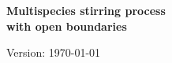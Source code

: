 \documentclass[10pt]{article}
\numberwithin{equation}{section}
\numberwithin{equation}{subsection}
\begin{document}
 
 
\begingroup
\begin{center}
 \begingroup\LARGE
\bf Multispecies stirring process \\
 with open boundaries
\par\endgroup
 \vspace{3.5em}
 \begingroup\large \bf
 \par\endgroup
\vspace{2em}

\begingroup\sffamily 
%  
\par\endgroup
\vspace{2em}

 Version: \today
\end{center}
%  

\thispagestyle{empty}

\begin{abstract}
\noindent
...
\end{abstract}


\tableofcontents

\end{document}
